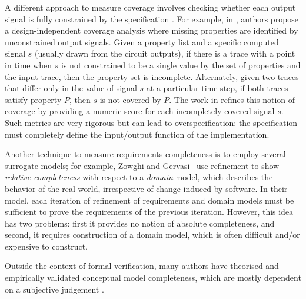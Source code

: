 A different approach to measure coverage involves checking whether each output signal is fully constrained by the specification \cite{das2005formal, claessen2007coverage, grosse2007estimating}. For example, in \cite{claessen2007coverage}, authors propose a design-independent coverage analysis where missing properties are identified by unconstrained output signals. Given a property list and a specific computed signal $s$ (usually drawn from the circuit outputs), if there is a trace with a point in time when $s$ is not constrained to be a single value by the set of properties and the input trace, then the property set is incomplete. Alternately, given two traces that differ only in the value of signal $s$ at a particular time step, if both traces satisfy property $P$, then $s$ is not covered by $P$.
 The work in \cite{haedicke2012guiding} refines this notion of coverage by providing a numeric score for each incompletely covered signal $s$.  Such metrics are very rigorous but can lead to overspecification: the specification must completely define the input/output function of the implementation.


Another technique to measure requirements completeness is to employ several surrogate models; for example, Zowghi and Gervasi~\cite{zowghi2003three} use refinement to show {\em relative completeness} with respect to a {\em domain} model, which describes the behavior of the real world, irrespective of change induced by software.  In their model, each iteration of refinement of requirements and domain models must be sufficient to prove the requirements of the previous iteration.  However, this idea has two problems: first it provides no notion of absolute completeness, and second, it requires construction of a domain model, which is often difficult and/or expensive to construct.

Outside the context of formal verification, many authors have theorised and empirically validated conceptual model completeness, which are mostly dependent on a subjective judgement \cite{drechsler2012completeness, firesmith2005your, chang2007finding,katta2013investigating, zowghi2003three, espana2009evaluating}.



